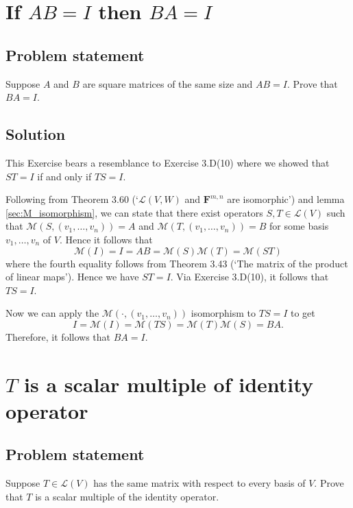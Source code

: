 \documentclass{article}
\begin{document}
\section{If $AB=I$ then $BA=I$}
\subsection*{Problem statement}
Suppose $A$ and $B$ are square matrices of the same size and $AB=I$. 
Prove that $BA=I$.

\subsection*{Solution}
This Exercise bears a resemblance to Exercise 3.D(10) where we showed that $ST=I$ if and only if $TS=I$. 

Following from Theorem 3.60 (`$\mathcal{L}(V,W)$ and $\mathbf{F}^{m,n}$ are isomorphic') and lemma \ref{sec:M_isomorphism}, we can state that there exist operators $S,T\in\mathcal{L}(V)$ such that $\mathcal{M}(S,(v_1,\ldots,v_n))=A$ and $\mathcal{M}(T,(v_1,\ldots,v_n))=B$ for some basis $v_1,\ldots,v_n$ of $V$. 
Hence it follows that 
\[\mathcal{M}(I)=I=AB=\mathcal{M}(S)\mathcal{M}(T)=\mathcal{M}(ST)\]
where the fourth equality follows from Theorem 3.43 (`The matrix of the product of linear maps'). 
Hence we have $ST=I$. 
Via Exercise 3.D(10), it follows that $TS=I$. 

Now we can apply the $\mathcal{M}(\cdot,(v_1,\ldots,v_n))$ isomorphism to $TS=I$ to get
\[I=\mathcal{M}(I)=\mathcal{M}(TS)=\mathcal{M}(T)\mathcal{M}(S)=BA.\]
Therefore, it follows that $BA=I$.

\clearpage

\section{$T$ is a scalar multiple of identity operator}
\subsection*{Problem statement}
Suppose $T\in\mathcal{L}(V)$ has the same matrix with respect to every basis of $V$. 
Prove that $T$ is a scalar multiple of the identity operator.
\end{document}
